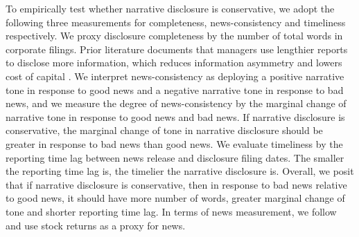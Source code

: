 \documentclass[a4paper]{article}
\begin{document}
\begin{spacing}{2}
To empirically test whether narrative disclosure is conservative, we adopt the following three measurements for completeness, news-consistency and timeliness respectively. We proxy disclosure completeness by the number of total words in corporate filings. Prior literature documents that managers use lengthier reports to disclose more information, which reduces information asymmetry and lowers cost of capital . We interpret news-consistency as deploying a positive narrative tone in response to good news and a negative narrative tone in response to bad news, and we measure the degree of news-consistency by the marginal change of narrative tone in response to good news and bad news. If narrative disclosure is conservative, the marginal change of tone in narrative disclosure should be greater in response to bad news than good news. We evaluate timeliness by the reporting time lag between news release and disclosure filing dates. The smaller the reporting time lag is, the timelier the narrative disclosure is. Overall, we posit that if narrative disclosure is conservative, then in response to bad news relative to good news, it should have more number of words, greater marginal change of tone and shorter reporting time lag. In terms of news measurement, we follow  and use stock returns as a proxy for news.


\end{spacing}
\end{document}
